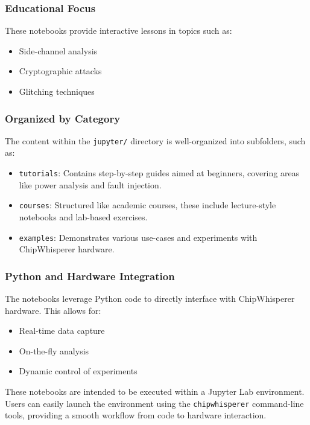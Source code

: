 \subsubsection{Educational Focus}

These notebooks provide interactive lessons in topics such as:

\begin{itemize}[label=--]
    \item Side-channel analysis
    \item Cryptographic attacks
    \item Glitching techniques
\end{itemize}

\subsubsection{Organized by Category}

The content within the \texttt{jupyter/} directory is well-organized into subfolders, such as:

\begin{itemize}
    \item \texttt{tutorials}: Contains step-by-step guides aimed at beginners, covering areas like power analysis and fault injection.
    \item \texttt{courses}: Structured like academic courses, these include lecture-style notebooks and lab-based exercises.
    \item \texttt{examples}: Demonstrates various use-cases and experiments with ChipWhisperer hardware.
\end{itemize}

\subsubsection{Python and Hardware Integration}

The notebooks leverage Python code to directly interface with ChipWhisperer hardware. This allows for:

\begin{itemize}
    \item Real-time data capture
    \item On-the-fly analysis
    \item Dynamic control of experiments
\end{itemize}
These notebooks are intended to be executed within a Jupyter Lab environment. Users can easily launch the environment using the \texttt{chipwhisperer} command-line tools, providing a smooth workflow from code to hardware interaction.

